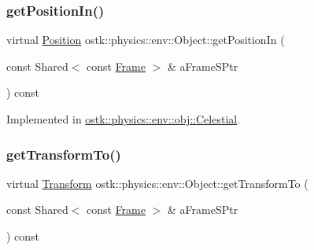 \mbox{\label{classostk_1_1physics_1_1env_1_1_object_a990c33e0cc9e9421488f9fc4cbbf3f21}} 
\subsubsection{\texorpdfstring{get\+Position\+In()}{getPositionIn()}}
{\footnotesize\ttfamily virtual \hyperlink{classostk_1_1physics_1_1coord_1_1_position}{Position} ostk\+::physics\+::env\+::\+Object\+::get\+Position\+In (\begin{DoxyParamCaption}\item[{const Shared$<$ const \hyperlink{classostk_1_1physics_1_1coord_1_1_frame}{Frame} $>$ \&}]{a\+Frame\+S\+Ptr }\end{DoxyParamCaption}) const\hspace{0.3cm}{\ttfamily [pure virtual]}}



Implemented in \hyperlink{classostk_1_1physics_1_1env_1_1obj_1_1_celestial_af38fd0017fe14cfb6103684fcb1d3ee9}{ostk\+::physics\+::env\+::obj\+::\+Celestial}.

\mbox{\label{classostk_1_1physics_1_1env_1_1_object_a720f81e696c3f4f81de8e7ae787fdf10}} 
\subsubsection{\texorpdfstring{get\+Transform\+To()}{getTransformTo()}}
{\footnotesize\ttfamily virtual \hyperlink{classostk_1_1physics_1_1coord_1_1_transform}{Transform} ostk\+::physics\+::env\+::\+Object\+::get\+Transform\+To (\begin{DoxyParamCaption}\item[{const Shared$<$ const \hyperlink{classostk_1_1physics_1_1coord_1_1_frame}{Frame} $>$ \&}]{a\+Frame\+S\+Ptr }\end{DoxyParamCaption}) const\hspace{0.3cm}{\ttfamily [pure virtual]}}



